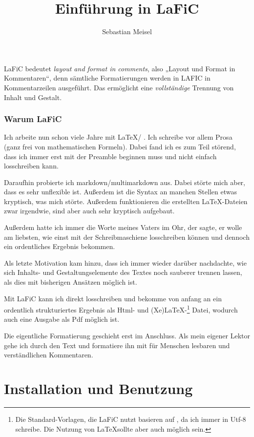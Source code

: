 \documentclass{scrartcl}
\title{Einführung in LaFiC}
\author{Sebastian Meisel}
\begin{document}
\maketitle


LaFiC bedeutet \textit{layout and format in comments}, also „Layout
und Format in Kommentaren“, denn sämtliche Formatierungen
werden in LAFIC in Kommentarzeilen ausgeführt. Das
ermöglicht eine \emph{vollständige} Trennung von Inhalt und
Gestalt.

\section{Warum LaFiC}

Ich arbeite nun schon viele Jahre mit \LaTeX / \XeLaTeX. Ich schreibe vor allem Prosa (ganz frei von mathematischen Formeln). Dabei fand ich es zum Teil störend, dass ich immer erst mit der Preamble beginnen muss und nicht einfach losschreiben kann.

Daraufhin probierte ich markdown/multimarkdown aus. Dabei störte mich aber, dass es sehr unflexible ist. Außerdem ist die Syntax an manchen Stellen etwas kryptisch, was mich störte. Außerdem funktionieren die erstellten \LaTeX-Dateien zwar irgendwie, sind aber auch sehr kryptisch aufgebaut.

Außerdem hatte ich immer die Worte meines Vaters im Ohr, der sagte, er wolle am liebsten, wie einst mit der Schreibmaschiene losschreiben können und dennoch ein ordentliches Ergebnis bekommen.

Als letzte Motivation kam hinzu, dass ich immer wieder darüber nachdachte, wie sich Inhalts- und Gestaltungselemente des Textes noch sauberer trennen lassen, als dies mit bisherigen Ansätzen möglich ist.

Mit LaFiC kann ich direkt losschreiben und bekomme von anfang an ein ordentlich strukturiertes Ergebnis als Html- und (Xe)LaTeX-\footnote{Die Standard-Vorlagen, die LaFiC nutzt basieren auf \XeLaTeX, da ich immer in Utf-8 schreibe. Die Nutzung von \LaTeX sollte aber auch möglich sein.}\xspace Datei, wodurch auch  eine Ausgabe als Pdf möglich ist.

Die eigentliche Formatierung geschieht erst im Anschluss. Als mein eigener Lektor gehe ich durch den Text und formatiere ihn mit für Menschen lesbaren und verständlichen Kommentaren.

\part{Installation und Benutzung}
\end{document}
